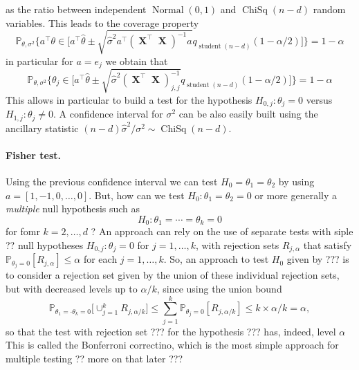 \documentclass[
	fontsize=11pt, %
	twoside=false, %
	numbers=noenddot, %
]{kaobook}
\DeclareMathOperator{\bX}{{\boldsymbol X}}
\DeclareMathOperator{\chisq}{ChiSq}
\DeclareMathOperator{\nor}{Normal}
\DeclareMathOperator{\stu}{student}
\renewcommand{\P}{\mathbb P}
\newcommand{\wh}{\widehat}
\begin{document}
as the ratio between independent $\nor(0, 1)$ and $\chisq(n - d)$ random variables.
This leads to the coverage property
\begin{equation*}
	\P_{\theta, \sigma^2} \bigg\{ a^\top \theta \in  \Big[  a^\top \wh \theta \pm \sqrt{\wh \sigma^2 a^\top (\bX^\top \bX)^{-1} a} q_{\stu(n-d)}(1 - \alpha/2) \Big] \bigg\} = 1 - \alpha
\end{equation*}
in particular for $a = e_j$ we obtain that
\begin{equation*}
	\P_{\theta, \sigma^2} \bigg\{ \theta_j \in  \Big[  a^\top \wh \theta \pm \sqrt{\wh \sigma^2 (\bX^\top \bX)_{j, j}^{-1}} q_{\stu(n-d)}(1 - \alpha/2) \Big] \bigg\} = 1 - \alpha
\end{equation*}
This allows in particular to build a test for the hypothesis $H_{0, j} : \theta_j = 0$ versus $H_{1, j} : \theta_j \neq 0$.
A confidence interval for $\sigma^2$ can be also easily built using the ancillary statistic $(n - d) \wh \sigma^2 / \sigma^2 \sim \chisq(n - d)$.

\paragraph{Fisher test.} %

Using the previous confidence interval we can test $H_0 = \theta_1 = \theta_2$ by using $a = [1, -1, 0, \ldots, 0]$. But, how can we test $H_0 : \theta_1 = \theta_2 = 0$ or more generally a \emph{multiple} null hypothesis such as
\begin{equation*}
	H_0 : \theta_1 = \cdots = \theta_k = 0
\end{equation*}
for fomr $k = 2, \ldots, d$ ?
An approach can rely on the use of separate tests with siple ?? null hypotheses $H_{0, j} : \theta_j = 0$ for $j=1, \ldots, k$, with rejection sets $R_{j, \alpha}$ that satisfy $\P_{\theta_j = 0}[R_{j, \alpha}] \leq \alpha$ for each $j=1, \ldots, k$.
So, an approach to test $H_0$ given by ??? is to consider a rejection set given by the union of these individual rejection sets, but with decreased levels up to $\alpha / k$, since using the union bound
\begin{equation*}
	\P_{\theta_1 = \cdot \theta_k = 0} \Big [  \cup_{j=1}^k R_{j, \alpha / k} \Big] 
	\leq \sum_{j=1}^k \P_{\theta_j = 0} [ R_{j, \alpha / k} ] \leq k \times \alpha / k = \alpha,
\end{equation*}
so that the test with rejection set ??? for the hypothesis ??? has, indeed, level $\alpha$
This is called the Bonferroni correctino, which is the most simple approach for multiple testing ?? more on that later ??? 
\end{document}
